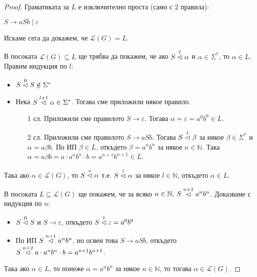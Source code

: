 \begin{proof}
    Граматиката за $L$ е изключително проста (само с 2 правила):
    \begin{center}
        $S \rightarrow aSb \mid \varepsilon$
    \end{center}
    Искаме сега да докажем, че $\mathcal{L}(G) = L$.

    В посоката $\mathcal{L}(G) \subseteq L$ ще трябва да покажем, че ако $S \stackrel{l}{\vartriangleleft} \alpha$ и $\alpha \in \Sigma^*$, то $\alpha \in L$.
    Правим индукция по $l$:
    \begin{itemize}
        \item $S \stackrel{0}{\vartriangleleft} S \notin \Sigma^*$ \checkmark
        \item Нека $S \stackrel{l + 1}{\vartriangleleft} \alpha \in \Sigma^*$.
              Тогава сме приложили някое правило.
              \begin{itemize}
                  \item[1 сл.] Приложили сме правилото $S \rightarrow \varepsilon$.
                        Тогава $\alpha = \varepsilon = a^0b^0 \in L$.
                  \item[2 сл.] Приложили сме правилото $S \rightarrow aSb$.
                        Тогава $S \stackrel{l}{\vartriangleleft} \beta$ за някое $\beta \in \Sigma^*$ и $\alpha = a \beta b$.
                        По ИП $\beta \in L$, откъдето $\beta = a^nb^n$ за някое $n \in \mathbb{N}$.
                        Така $\alpha = a \beta b = a \cdot a^nb^n \cdot b = a^{n+1}b^{n+1} \in L$.
              \end{itemize}
    \end{itemize}

    Така ако $\alpha \in \mathcal{L}(G)$, то $S \stackrel{*}{\vartriangleleft} \alpha$ т.е. $S \stackrel{l}{\vartriangleleft} \alpha$ за някое $l \in \mathbb{N}$, откъдето $\alpha \in L$.

    В посоката $L \subseteq \mathcal{L}(G)$ ще покажем, че за всяко $n \in \mathbb{N}, \: S \stackrel{n + 1}{\vartriangleleft} a^nb^n$.
    Доказваме с индукция по $n$:
    \begin{itemize}
        \item $S \stackrel{0}{\vartriangleleft} S$ и $S \rightarrow \varepsilon$, откъдето $S \stackrel{1}{\vartriangleleft} \varepsilon = a^0b^0$ \checkmark
        \item По ИП $S \stackrel{n+1}{\vartriangleleft} a^nb^n$, но освен това $S \rightarrow aSb$, откъдето $S \stackrel{n + 2}{\vartriangleleft} a \cdot a^nb^n \cdot b = a^{n + 1}b^{n + 1}$.
    \end{itemize}

    Така ако $\alpha \in L$, то понеже $\alpha = a^nb^n$ за някое $n \in \mathbb{N}$, то тогава $\alpha \in \mathcal{L}(G)$.
\end{proof}

